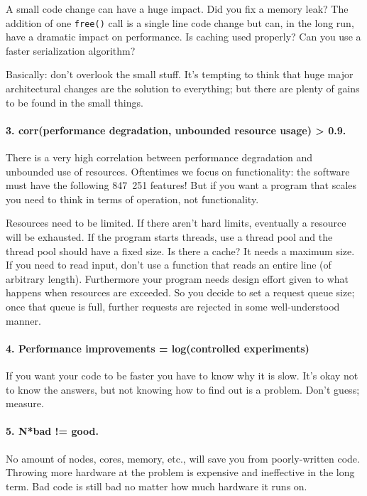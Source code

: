 A small code change can have a huge impact. Did you fix a memory leak? The addition of one \texttt{free()} call is a single line code change but can, in the long run, have a dramatic impact on performance. Is caching used properly? Can you use a faster serialization algorithm? 

Basically: don't overlook the small stuff. It's tempting to think that huge major architectural changes are the solution to everything; but there are plenty of gains to be found in the small things.

\paragraph{3. corr(performance degradation, unbounded resource usage) > 0.9.}
There is a very high correlation between performance degradation and unbounded use of resources. Oftentimes we focus on functionality: the software must have the following 847~251 features! But if you want a program that scales you need to think in terms of operation, not functionality.

Resources need to be limited. If there aren't hard limits, eventually a resource will be exhausted. If the program starts threads, use a thread pool and the thread pool should have a fixed size. Is there a cache? It needs a maximum size. If you need to read input, don't use a function that reads an entire line (of arbitrary length). Furthermore your program needs design effort given to what happens when resources are exceeded. So you decide to set a request queue size; once that queue is full, further requests are rejected in some well-understood manner. 

\paragraph{4. Performance improvements = log(controlled experiments)}
If you want your code to be faster you have to know why it is slow. It's okay not to know the answers, but not knowing how to find out is a problem. Don't guess; measure.


\paragraph{5. N*bad != good.}
No amount of nodes, cores, memory, etc., will save you from poorly-written code. Throwing more hardware at the problem is expensive and ineffective in the long term. Bad code is still bad no matter how much hardware it runs on. 


